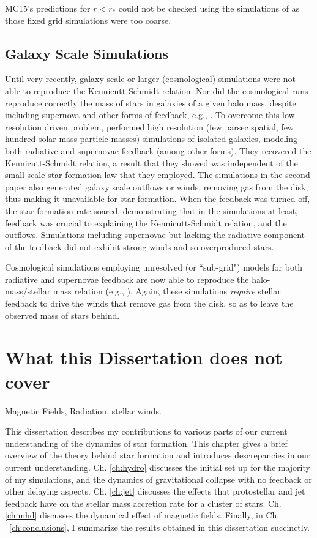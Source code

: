 \documentclass[../dissertation.tex]{subfiles}
\begin{document}
MC15's predictions for $r<r_*$ could not be checked using the simulations
of \citet{2015ApJ...800...49L} as those fixed grid simulations were
too coarse.  


\subsection {Galaxy Scale Simulations}

Until very recently, galaxy-scale or larger (cosmological) simulations 
were not able to reproduce the Kennicutt-Schmidt relation. 
Nor did the cosmological runs reproduce correctly the mass of stars in galaxies of a given 
halo mass, despite including supernova and other forms of feedback, 
e.g., \citet{2010MNRAS.404.1111G,2010Natur.463..203G,2011MNRAS.410.2625P}.
To overcome this low resolution driven problem, \citet{2011MNRAS.417..950H,2012MNRAS.421.3522H}
performed high resolution (few parsec spatial, few hundred solar mass particle masses) simulations 
of isolated galaxies, modeling both radiative and supernovae feedback (among other forms). 
They recovered the Kennicutt-Schmidt relation, a result that they 
showed was independent of the small-scale star formation
law that they employed. 
The simulations in the second paper also generated galaxy 
scale outflows or winds, removing gas from the disk, thus making it unavailable for star 
formation. 
When the feedback was turned off, the star formation rate soared, demonstrating that
in the simulations at least, feedback was crucial to explaining the Kennicutt-Schmidt relation, and
the outflows. 
Simulations including supernovae but lacking the radiative component of the feedback
did not exhibit strong winds and so overproduced stars.

Cosmological simulations employing unresolved (or ``sub-grid") models for both 
radiative and supernovae feedback are now able to reproduce the halo-mass/stellar mass relation (e.g.,
\citealt{2013MNRAS.434.3142A,2014MNRAS.445..581H,2015ApJ...804...18A}). Again, 
these simulations {\em require} 
stellar feedback to drive the winds that remove gas from the disk, so as to leave the observed mass of stars behind. 


\section{What this Dissertation does not cover}
Magnetic Fields, Radiation, stellar winds.


This dissertation describes my contributions to various parts of our current understanding of the dynamics of star formation. 
This chapter gives a brief overview of the theory behind star formation and introduces descrepancies in our current understanding. 
Ch. \ref{ch:hydro} discusses the initial set up for the majority of my simulations, and the dynamics of gravitational collapse with no feedback or other delaying aspects.
Ch. \ref{ch:jet} discusses the effects that protostellar and jet feedback have on the stellar mass accretion rate for a cluster of stars.
Ch. \ref{ch:mhd} discusses the dynamical effect of magnetic fields. %
Finally, in Ch. ~\ref{ch:conclusions}, I summarize the results obtained in this dissertation succinctly.
\end{document}
